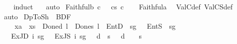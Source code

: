 \begin{isabellebody}
%
\isadelimproof
\ \ %
\endisadelimproof
%
\isatagproof
{}\isamarkupfalse%
\ {\isacharparenleft}{\kern0pt}induct\ {\isasymphi}{\isacharparenright}{\kern0pt}\ \isamarkupfalse%
\ auto%
\endisatagproof
{\isafoldproof}%
%
\isadelimproof
\isanewline
%
\endisadelimproof
\isanewline
{}\isamarkupfalse%
\ Faithful{}b{\isacharcolon}{\kern0pt}\ {\isachardoublequoteopen}{\isasymTurnstile}\isactrlsup c\ {\isasymphi}\ {\isasymlongleftrightarrow}\ {\isasymTurnstile}\isactrlsup c\isactrlsup s\ {\isasymlangle}{\isasymphi}{\isasymrangle}\isactrlsup c{\isachardoublequoteclose}\isanewline
%
\isadelimproof
\ \ %
\endisadelimproof
%
\isatagproof
{}\isamarkupfalse%
\ Faithful{}a\ \isamarkupfalse%
\ ValC{\isacharunderscore}{\kern0pt}def\ ValCS{\isacharunderscore}{\kern0pt}def\ \isamarkupfalse%
\ auto\isanewline
\isanewline
%
%
\endisatagproof
{\isafoldproof}%
%
\isadelimproof
\isanewline
%
\endisadelimproof
{}\isamarkupfalse%
\ DpToSh\ {\isacharcolon}{\kern0pt}{\isacharcolon}{\kern0pt}\ {\isachardoublequoteopen}BDF{\isasymRightarrow}{\isasymsigma}{\isachardoublequoteclose}\ {\isacharparenleft}{\kern0pt}{\isachardoublequoteopen}{\isasymlparr}{\isacharunderscore}{\kern0pt}{\isasymrparr}{\isachardoublequoteclose}{\isacharparenright}{\kern0pt}\ \isanewline
\ \ \ \ {\isachardoublequoteopen}{\isasymlparr}x\isactrlsup a{\isasymrparr}\ {\isacharequal}{\kern0pt}\ x\isactrlsup s{\isachardoublequoteclose}\ {\isacharbar}{\kern0pt}\ {\isachardoublequoteopen}{\isasymlparr}Done\isactrlsup d\ l{\isasymrparr}\ {\isacharequal}{\kern0pt}\ Done\isactrlsup s\ l{\isachardoublequoteclose}\ {\isacharbar}{\kern0pt}\ {\isachardoublequoteopen}{\isasymlparr}EntD\ {\isasymPhi}\ sg\ {\isasymphi}{\isasymrparr}\ {\isacharequal}{\kern0pt}\ EntS\ {\isasymPhi}\ sg\ {\isasymphi}{\isachardoublequoteclose}\isanewline
\ \ {\isacharbar}{\kern0pt}\ {\isachardoublequoteopen}{\isasymlparr}ExJD\ i\ sg\ {\isasymphi}{\isasymrparr}\ {\isacharequal}{\kern0pt}\ ExJS\ i\ sg\ {\isasymphi}{\isachardoublequoteclose}\ {\isacharbar}{\kern0pt}\ {\isachardoublequoteopen}{\isasymlparr}{\isasymnot}\isactrlsup d{\isasymphi}{\isasymrparr}\ {\isacharequal}{\kern0pt}\ {\isasymnot}\isactrlsup s{\isasymlparr}{\isasymphi}{\isasymrparr}{\isachardoublequoteclose}\ {\isacharbar}{\kern0pt}\ {\isachardoublequoteopen}{\isasymlparr}{\isasymphi}\ {\isasymsupset}\isactrlsup d\ {\isasympsi}{\isasymrparr}\ {\isacharequal}{\kern0pt}\ {\isasymlparr}{\isasymphi}{\isasymrparr}\ {\isasymsupset}\isactrlsup s\ {\isasymlparr}{\isasympsi}{\isasymrparr}{\isachardoublequoteclose}\isanewline

\end{isabellebody}
